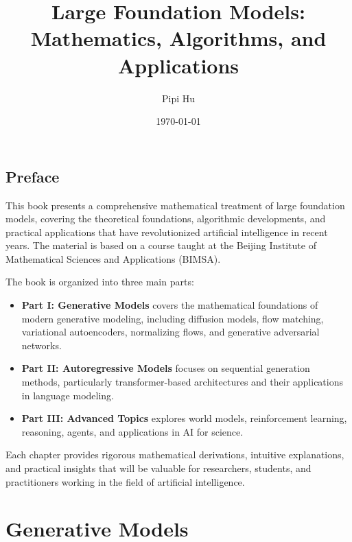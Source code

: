 \documentclass[11pt]{book}
\title{Large Foundation Models: Mathematics, Algorithms, and Applications}
\author{Pipi Hu}
\date{\today}
\theoremstyle{definition}
\begin{document}
\frontmatter

\maketitle

\tableofcontents

\listoffigures

\listoftables

\chapter*{Preface}

This book presents a comprehensive mathematical treatment of large foundation models, covering the theoretical foundations, algorithmic developments, and practical applications that have revolutionized artificial intelligence in recent years. The material is based on a course taught at the Beijing Institute of Mathematical Sciences and Applications (BIMSA).

The book is organized into three main parts:
\begin{itemize}
    \item \textbf{Part I: Generative Models} covers the mathematical foundations of modern generative modeling, including diffusion models, flow matching, variational autoencoders, normalizing flows, and generative adversarial networks.
    \item \textbf{Part II: Autoregressive Models} focuses on sequential generation methods, particularly transformer-based architectures and their applications in language modeling.
    \item \textbf{Part III: Advanced Topics} explores world models, reinforcement learning, reasoning, agents, and applications in AI for science.
\end{itemize}

Each chapter provides rigorous mathematical derivations, intuitive explanations, and practical insights that will be valuable for researchers, students, and practitioners working in the field of artificial intelligence.

\mainmatter

\part{Generative Models}
\end{document}
